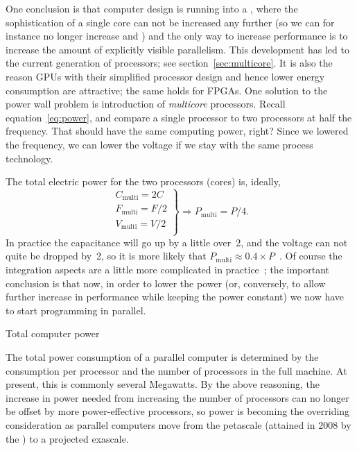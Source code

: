 One conclusion is that computer design
is running into a , where the sophistication
of a single core can not be increased any further (so we can for
instance no longer increase  and
) and the only way to increase
performance is to increase the amount of explicitly visible
parallelism. This development has led to the current generation of
 processors; see section~\ref{sec:multicore}. It
is also the reason \acp{GPU} with their simplified processor design
and hence lower energy consumption
are attractive; the same holds for \acp{FPGA}.
One solution to the power wall problem is introduction
of \emph{multicore} processors.
Recall equation~\ref{eq:power}, and compare a single processor to two 
processors at half the frequency. That should have the same computing power, right?
Since we lowered the frequency, we can lower the voltage if we stay with the same 
process technology.

The total electric power for the two processors (cores) is, ideally,
\[ \left.
\begin{array}{c}
C_{\mathrm{multi}} = 2C\\
F_{\mathrm{multi}} = F/2\\
V_{\mathrm{multi}} = V/2\\
\end{array}\right\} \Rightarrow
P_{\mathrm{multi}} = P/4.
\]
In practice the capacitance will go up by a little over~2, and the
voltage can not quite be dropped by~2, so it is more likely that
$P_{\mathrm{multi}} \approx 0.4\times
P$~\cite{Chandrakasa:transformations}.  Of course the integration
aspects are a little more complicated in
practice~\cite{Bohr:ISSCC2009}; the important conclusion is that now,
in order to lower the power (or, conversely, to allow further increase
in performance while keeping the power constant) we now have to start
programming in parallel.

 {Total computer power}

The total power consumption of a parallel computer is determined by
the consumption per processor and the number of processors in the full
machine. At present, this is commonly several Megawatts. By the above
reasoning, the increase in power needed from increasing the number of
processors can no longer be offset by more power-effective processors,
so power is becoming the overriding consideration as parallel
computers move from the petascale (attained in 2008 by the
) to a projected exascale.


